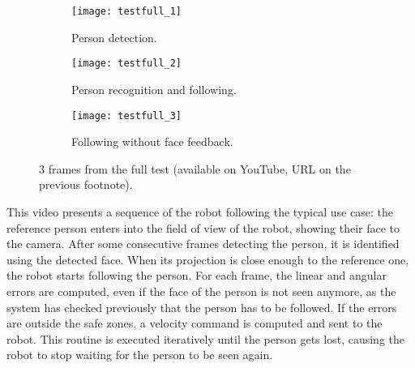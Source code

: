 \begin{figure}[h]
	\centering
	\begin{subfigure}[t]{0.32\linewidth}
		\centering
		\texttt{[image: testfull\_1]}
		\caption{Person detection.}
	\end{subfigure}
	\begin{subfigure}[t]{0.32\linewidth}
		\centering
		\texttt{[image: testfull\_2]}
		\caption{Person recognition and following.}
	\end{subfigure}
	\begin{subfigure}[t]{0.32\linewidth}
		\centering
		\texttt{[image: testfull\_3]}
		\caption{Following without face feedback.}
	\end{subfigure}
	\caption{3 frames from the full test (available on YouTube, URL on the previous footnote).}
	\label{fig:3_testfull_frames}
\end{figure}



This video presents a sequence of the robot following the typical use case: the reference person enters into the field of view of the robot, showing their face to the camera. After some consecutive frames detecting the person, it is identified using the detected face. When its projection is close enough to the reference one, the robot starts following the person. For each frame, the linear and angular errors are computed, even if the face of the person is not seen anymore, as the system has checked previously that the person has to be followed. If the errors are outside the safe zones, a velocity command is computed and sent to the robot. This routine is executed iteratively until the person gets lost, causing the robot to stop waiting for the person to be seen again.



